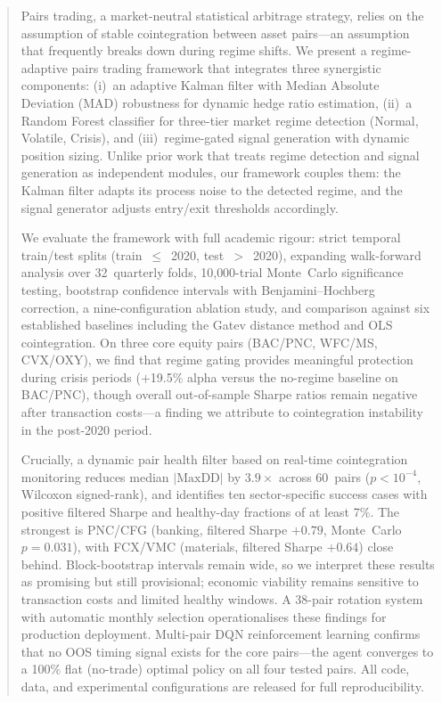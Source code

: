 \documentclass{ieeeaccess}
\begin{document}
\begin{abstract}
Pairs trading, a market-neutral statistical arbitrage strategy, relies on the assumption of stable cointegration between asset pairs---an assumption that frequently breaks down during regime shifts.
We present a regime-adaptive pairs trading framework that integrates three synergistic components: (i)~an adaptive Kalman filter with Median Absolute Deviation (MAD) robustness for dynamic hedge ratio estimation, (ii)~a Random Forest classifier for three-tier market regime detection (Normal, Volatile, Crisis), and (iii)~regime-gated signal generation with dynamic position sizing.
Unlike prior work that treats regime detection and signal generation as independent modules, our framework couples them: the Kalman filter adapts its process noise to the detected regime, and the signal generator adjusts entry/exit thresholds accordingly.

We evaluate the framework with full academic rigour: strict temporal train/test splits (train~$\leq$~2020, test~$>$~2020), expanding walk-forward analysis over 32~quarterly folds, 10{,}000-trial Monte~Carlo significance testing, bootstrap confidence intervals with Benjamini--Hochberg correction, a nine-configuration ablation study, and comparison against six established baselines including the Gatev distance method and OLS cointegration.
On three core equity pairs (BAC/PNC, WFC/MS, CVX/OXY), we find that regime gating provides meaningful protection during crisis periods ($+$19.5\% alpha versus the no-regime baseline on BAC/PNC), though overall out-of-sample Sharpe ratios remain negative after transaction costs---a finding we attribute to cointegration instability in the post-2020 period.

Crucially, a dynamic pair health filter based on real-time cointegration monitoring reduces median $|\text{MaxDD}|$ by $3.9\times$ across 60~pairs ($p < 10^{-4}$, Wilcoxon signed-rank), and identifies ten sector-specific success cases with positive filtered Sharpe and healthy-day fractions of at least 7\%.
The strongest is PNC/CFG (banking, filtered Sharpe $+0.79$, Monte~Carlo $p = 0.031$), with FCX/VMC (materials, filtered Sharpe $+0.64$) close behind.
Block-bootstrap intervals remain wide, so we interpret these results as promising but still provisional; economic viability remains sensitive to transaction costs and limited healthy windows.
A 38-pair rotation system with automatic monthly selection operationalises these findings for production deployment.
Multi-pair DQN reinforcement learning confirms that no OOS timing signal exists for the core pairs---the agent converges to a 100\% flat (no-trade) optimal policy on all four tested pairs.
All code, data, and experimental configurations are released for full reproducibility.
\end{abstract}
\end{document}
